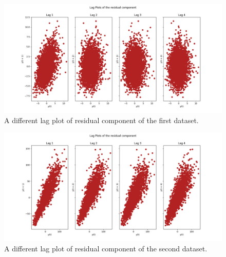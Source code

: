 \documentclass[12pt]{article}
\begin{document}
\begin{enumerate}
\begin{figure}[H]
    \centering
    \begin{minipage}[b]{1\textwidth}
        \includegraphics[width=\textwidth]{figures/Ass1/Ass1_D1_Lag_Plots_residual.png}
    \end{minipage}
    \caption{A different lag plot of residual component of the first dataset.}
    \label{fig:Ass1_D1_Lag_Plots_residual}
\end{figure}

\begin{figure}[H]
    \centering
    \begin{minipage}[b]{1\textwidth}
        \includegraphics[width=\textwidth]{figures/Ass1/Ass1_D2_Lag_Plots_residual.png}
    \end{minipage}
    \caption{A different lag plot of residual component of the second dataset.}
    \label{fig:Ass1_D2_Lag_Plots_residual}
\end{figure}










\end{enumerate}
\end{document}

